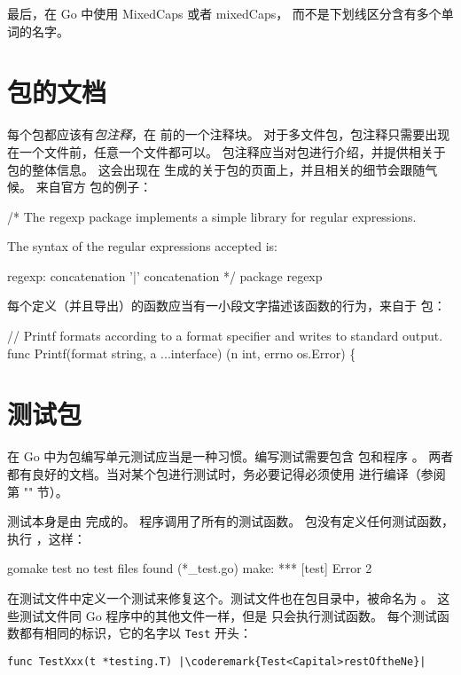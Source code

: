 最后，在 Go 中使用 MixedCaps 或者 mixedCaps，
而不是下划线区分含有多个单词的名字。


\section{包的文档}
每个包都应该有\emph{包注释}，在  前的一个注释块。
对于多文件包，包注释只需要出现在一个文件前，任意一个文件都可以。
包注释应当对包进行介绍，并提供相关于包的整体信息。
这会出现在  生成的关于包的页面上，并且相关的细节会跟随气候。
来自官方  包的例子：
\begin{display}
/*
    The regexp package implements a simple library for
    regular expressions.

    The syntax of the regular expressions accepted is:

    regexp:
        concatenation { '|' concatenation }
*/
package regexp
\end{display}

每个定义（并且导出）的函数应当有一小段文字描述该函数的行为，来自于
  包：
\begin{display}
// Printf formats according to a format specifier and writes to standard output.
func Printf(format string, a ...interface{}) (n int, errno os.Error) \{
\end{display}

\section{测试包}
在 Go 中为包编写单元测试应当是一种习惯。编写测试需要包含
 包和程序 。
两者都有良好的文档。当对某个包进行测试时，务必要记得必须使用
 进行编译（参阅第 "" 节）。


测试本身是由  完成的。
 程序调用了所有的测试函数。
 包没有定义任何测试函数，执行 ，这样：
\begin{display}
\pr gomake test
no test files found (*_test.go)
make: *** [test] Error 2
\end{display}
在测试文件中定义一个测试来修复这个。测试文件也在包目录中，被命名为 。
这些测试文件同 Go 程序中的其他文件一样，但是  只会执行测试函数。
每个测试函数都有相同的标识，它的名字以 \lstinline{Test} 开头：
\begin{lstlisting}
func TestXxx(t *testing.T) |\coderemark{Test<Capital>restOftheNe}|
\end{lstlisting}

